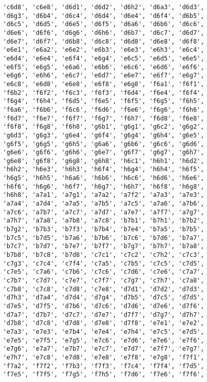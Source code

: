 \begin{verbatim}
    'c6d8', 'c6e8', 'd6d1', 'd6d2', 'd6h2', 'd6a3', 'd6d3',
    'd6g3', 'd6b4', 'd6c4', 'd6d4', 'd6e4', 'd6f4', 'd6b5',
    'd6c5', 'd6d5', 'd6e5', 'd6f5', 'd6a6', 'd6b6', 'd6c6',
    'd6e6', 'd6f6', 'd6g6', 'd6h6', 'd6b7', 'd6c7', 'd6d7',
    'd6e7', 'd6f7', 'd6b8', 'd6c8', 'd6d8', 'd6e8', 'd6f8',
    'e6e1', 'e6a2', 'e6e2', 'e6b3', 'e6e3', 'e6h3', 'e6c4',
    'e6d4', 'e6e4', 'e6f4', 'e6g4', 'e6c5', 'e6d5', 'e6e5',
    'e6f5', 'e6g5', 'e6a6', 'e6b6', 'e6c6', 'e6d6', 'e6f6',
    'e6g6', 'e6h6', 'e6c7', 'e6d7', 'e6e7', 'e6f7', 'e6g7',
    'e6c8', 'e6d8', 'e6e8', 'e6f8', 'e6g8', 'f6a1', 'f6f1',
    'f6b2', 'f6f2', 'f6c3', 'f6f3', 'f6d4', 'f6e4', 'f6f4',
    'f6g4', 'f6h4', 'f6d5', 'f6e5', 'f6f5', 'f6g5', 'f6h5',
    'f6a6', 'f6b6', 'f6c6', 'f6d6', 'f6e6', 'f6g6', 'f6h6',
    'f6d7', 'f6e7', 'f6f7', 'f6g7', 'f6h7', 'f6d8', 'f6e8',
    'f6f8', 'f6g8', 'f6h8', 'g6b1', 'g6g1', 'g6c2', 'g6g2',
    'g6d3', 'g6g3', 'g6e4', 'g6f4', 'g6g4', 'g6h4', 'g6e5',
    'g6f5', 'g6g5', 'g6h5', 'g6a6', 'g6b6', 'g6c6', 'g6d6',
    'g6e6', 'g6f6', 'g6h6', 'g6e7', 'g6f7', 'g6g7', 'g6h7',
    'g6e8', 'g6f8', 'g6g8', 'g6h8', 'h6c1', 'h6h1', 'h6d2',
    'h6h2', 'h6e3', 'h6h3', 'h6f4', 'h6g4', 'h6h4', 'h6f5',
    'h6g5', 'h6h5', 'h6a6', 'h6b6', 'h6c6', 'h6d6', 'h6e6',
    'h6f6', 'h6g6', 'h6f7', 'h6g7', 'h6h7', 'h6f8', 'h6g8',
    'h6h8', 'a7a1', 'a7g1', 'a7a2', 'a7f2', 'a7a3', 'a7e3',
    'a7a4', 'a7d4', 'a7a5', 'a7b5', 'a7c5', 'a7a6', 'a7b6',
    'a7c6', 'a7b7', 'a7c7', 'a7d7', 'a7e7', 'a7f7', 'a7g7',
    'a7h7', 'a7a8', 'a7b8', 'a7c8', 'b7b1', 'b7h1', 'b7b2',
    'b7g2', 'b7b3', 'b7f3', 'b7b4', 'b7e4', 'b7a5', 'b7b5',
    'b7c5', 'b7d5', 'b7a6', 'b7b6', 'b7c6', 'b7d6', 'b7a7',
    'b7c7', 'b7d7', 'b7e7', 'b7f7', 'b7g7', 'b7h7', 'b7a8',
    'b7b8', 'b7c8', 'b7d8', 'c7c1', 'c7c2', 'c7h2', 'c7c3',
    'c7g3', 'c7c4', 'c7f4', 'c7a5', 'c7b5', 'c7c5', 'c7d5',
    'c7e5', 'c7a6', 'c7b6', 'c7c6', 'c7d6', 'c7e6', 'c7a7',
    'c7b7', 'c7d7', 'c7e7', 'c7f7', 'c7g7', 'c7h7', 'c7a8',
    'c7b8', 'c7c8', 'c7d8', 'c7e8', 'd7d1', 'd7d2', 'd7d3',
    'd7h3', 'd7a4', 'd7d4', 'd7g4', 'd7b5', 'd7c5', 'd7d5',
    'd7e5', 'd7f5', 'd7b6', 'd7c6', 'd7d6', 'd7e6', 'd7f6',
    'd7a7', 'd7b7', 'd7c7', 'd7e7', 'd7f7', 'd7g7', 'd7h7',
    'd7b8', 'd7c8', 'd7d8', 'd7e8', 'd7f8', 'e7e1', 'e7e2',
    'e7a3', 'e7e3', 'e7b4', 'e7e4', 'e7h4', 'e7c5', 'e7d5',
    'e7e5', 'e7f5', 'e7g5', 'e7c6', 'e7d6', 'e7e6', 'e7f6',
    'e7g6', 'e7a7', 'e7b7', 'e7c7', 'e7d7', 'e7f7', 'e7g7',
    'e7h7', 'e7c8', 'e7d8', 'e7e8', 'e7f8', 'e7g8', 'f7f1',
    'f7a2', 'f7f2', 'f7b3', 'f7f3', 'f7c4', 'f7f4', 'f7d5',
    'f7e5', 'f7f5', 'f7g5', 'f7h5', 'f7d6', 'f7e6', 'f7f6',

\end{verbatim}

